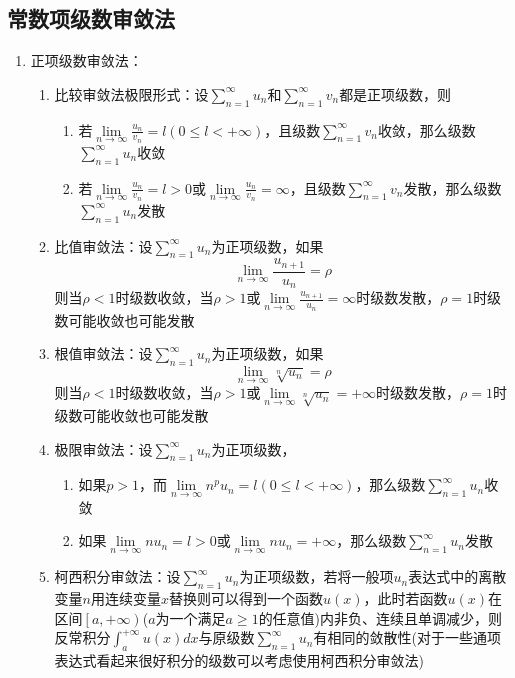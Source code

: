 \documentclass[12pt,a4paper,UTF8]{book}
\begin{document}
\subsection{常数项级数审敛法}
\begin{enumerate}
\item 正项级数审敛法：
\begin{enumerate}
\item 比较审敛法极限形式：设$\sum\limits_{n=1}^{\infty}u_n$和$\sum\limits_{n=1}^{\infty}v_n$都是正项级数，则
\begin{enumerate}
\item 若$\lim\limits_{n\to\infty}\frac{u_n}{v_n}=l\left(0\leq l<+\infty\right)$，且级数$\sum\limits_{n=1}^{\infty}v_n$收敛，那么级数$\sum\limits_{n=1}^{\infty}u_n$收敛
\item 若$\lim\limits_{n\to\infty}\frac{u_n}{v_n}=l>0$或$\lim\limits_{n\to\infty}\frac{u_n}{v_n}=\infty$，且级数$\sum\limits_{n=1}^{\infty}v_n$发散，那么级数$\sum\limits_{n=1}^{\infty}u_n$发散
\end{enumerate}
\item 比值审敛法：设$\sum\limits_{n=1}^{\infty}u_n$为正项级数，如果
\[\lim\limits_{n\to\infty}\frac{u_{n+1}}{u_n}=\rho\]
则当$\rho<1$时级数收敛，当$\rho>1$或$\lim\limits_{n\to\infty}\frac{u_{n+1}}{u_n}=\infty$时级数发散，$\rho=1$时级数可能收敛也可能发散
\item 根值审敛法：设$\sum\limits_{n=1}^{\infty}u_n$为正项级数，如果
\[\lim\limits_{n\to\infty}\sqrt[n]{u_n}=\rho\]
则当$\rho<1$时级数收敛，当$\rho>1$或$\lim\limits_{n\to\infty}\sqrt[n]{u_n}=+\infty$时级数发散，$\rho=1$时级数可能收敛也可能发散
\item 极限审敛法：设$\sum\limits_{n=1}^{\infty}u_n$为正项级数，
\begin{enumerate}
\item 如果$p>1$，而$\lim\limits_{n\to\infty}n^pu_n=l\left(0\leq l<+\infty\right)$，那么级数$\sum\limits_{n=1}^{\infty}u_n$收敛
\item 如果$\lim\limits_{n\to\infty}nu_n=l>0$或$\lim\limits_{n\to\infty}nu_n=+\infty$，那么级数$\sum\limits_{n=1}^{\infty}u_n$发散
\end{enumerate}
\item 柯西积分审敛法：设$\sum\limits_{n=1}^{\infty}u_n$为正项级数，若将一般项$u_n$表达式中的离散变量$n$用连续变量$x$替换则可以得到一个函数$u\left(x\right)$，此时若函数$u\left(x\right)$在区间$\left[a,+\infty\right)$($a$为一个满足$a\ge 1$的任意值)内非负、连续且单调减少，则反常积分$\int_{a}^{+\infty}u\left(x\right)dx$与原级数$\sum\limits_{n=1}^{\infty}u_n$有相同的敛散性(对于一些通项表达式看起来很好积分的级数可以考虑使用柯西积分审敛法)

\end{enumerate}
\end{enumerate}
\end{document}
